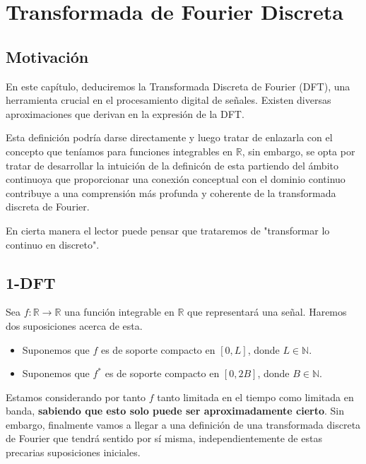 
\chapter{Transformada de Fourier Discreta}

\section{Motivación}

En este capítulo, deduciremos la Transformada Discreta de Fourier (DFT), una herramienta crucial en el procesamiento digital de señales.
Existen diversas aproximaciones que derivan en la expresión de la DFT. 

Esta definición podría darse directamente y luego tratar de enlazarla con el concepto que teníamos para funciones integrables en $\mathbb{R}$, sin embargo, se opta por tratar de desarrollar la intuición de la definicón de esta partiendo  del ámbito continuoya que proporcionar una conexión conceptual con el dominio continuo contribuye a una comprensión más profunda y coherente de la transformada discreta de Fourier.

En cierta manera el lector puede pensar que trataremos de "transformar lo continuo en discreto".


\section{1-DFT}

Sea $f : \mathbb{R} \rightarrow  \mathbb{R}$  una función integrable en $\mathbb{R}$ que representará una señal. Haremos dos suposiciones acerca de esta.
\begin{itemize}
    \item Suponemos que \( f \) es de soporte compacto en \([0, L]\), donde \( L \in \mathbb{N} \).
    \item Suponemos que \( f^* \) es de soporte compacto en  \([0, 2B]\), donde \( B \in \mathbb{N} \).
\end{itemize}


\noindent Estamos considerando  por tanto $f$ tanto limitada en el tiempo como limitada en banda, \textbf{sabiendo que esto solo puede ser aproximadamente cierto}. Sin embargo, finalmente vamos a llegar a una definición de una transformada discreta de Fourier que tendrá sentido por sí misma, independientemente de estas precarias suposiciones iniciales.

